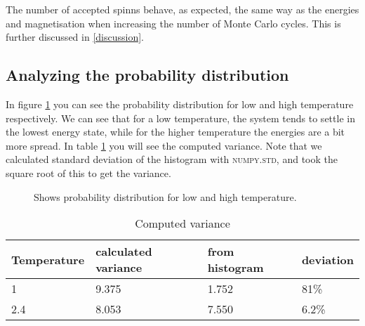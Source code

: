 \documentclass[../main.tex]{subfiles}
\begin{document}
The number of accepted spinns behave, as expected, the same way as the energies and magnetisation when increasing the number of Monte Carlo cycles. This is further discussed in \ref{discussion}.

\subsection{Analyzing the probability distribution}
In figure \ref{fig:results-ProbE_T24} you can see the probability distribution for low and high temperature respectively. We can see that for a low temperature, the system tends to settle in the lowest energy state, while for the higher temperature the energies are a bit more spread. In table \ref{tab:results-variance} you will see the computed variance. Note that we calculated standard deviation of the histogram with \textsc{numpy.std}, and took the square root of this to get the variance.

\begin{figure}[!h]
  \centering
  \caption{Shows probability distribution for low and high temperature.}
  \label{fig:results-ProbE_T24}
\end{figure}
\FloatBarrier

\begin{table}[!h]
  \begin{center}
    \begin{tabular}{|l| l| l| l|}
      \hline
      Temperature & calculated variance & from histogram & deviation\\
      \hline
      1 & 9.375 & 1.752 & 81\%\\
      2.4 & 8.053  & 7.550 & 6.2\%\\
      \hline
    \end{tabular}
    \caption{Computed variance}
    \label{tab:results-variance}
  \end{center}
\end{table}
\FloatBarrier

\end{document}
